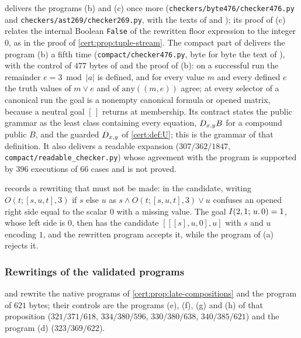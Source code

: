  delivers the programs (b) and (c) once more
(\texttt{checkers/byte476/checker476.py} and
\texttt{checkers/ast269/checker269.py}, with the texts of
 and ); its proof
of (c) relates the internal Boolean \texttt{False} of the rewritten floor
expression to the integer $0$, as in the proof of \cref{cert:prop:tuple-stream}.
The compact part of  delivers the program (b) a fifth
time (\texttt{compact/checker476.py}, byte for byte the text of
), with the control of $477$ bytes of
 and the proof of (b): on a successful run the remainder
$e=3\bmod\lvert a\rvert$ is defined, and for every value $m$ and every defined
$e$ the truth values of $m\lor e$ and of $\mathrm{any}((m,e))$ agree; at every
selector of a canonical run the goal is a nonempty canonical formula or opened
matrix, because a neutral goal $[\,]$ returns at membership. Its contract states
the public grammar as the least class containing every equation, $D_{x,y}B$ for
a compound public $B$, and the guarded $D_{x,y}$ of \cref{cert:def:U}; this is
the grammar of that definition. It also delivers a readable expansion
($307/362/1847$, \texttt{compact/readable\_checker.py}) whose agreement with the
program is supported by $396$ executions of $66$ cases and is not proved.

 records a rewriting that must not be made: in
the candidate, writing $O(t;[s,u,t],3)$ if $s$ else $u$ as
$s\land O(t;[s,u,t],3)\lor u$ confuses an opened right side equal to the scalar
$0$ with a missing value. The goal $I(2,1;\,u.\,0)=1$, whose left side is $0$,
then has the candidate $[[[s],u,0],u]$ with $s$ and $u$ encoding $1$, and the
rewritten program accepts it, while the program of (a) rejects it.

\subsubsection*{Rewritings of the validated programs}

 and  rewrite
the native programs of \cref{cert:prop:late-compositions} and the program of
$621$ bytes; their controls are the programs (e), (f), (g) and (h) of that
proposition ($321/371/618$, $334/380/596$, $330/380/638$, $340/385/621$) and the
program (d) ($323/369/622$).

